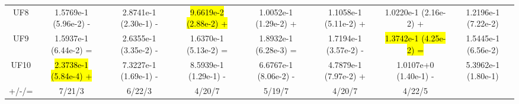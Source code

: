 \documentclass[journal]{IEEEtran}
\begin{document}
\begin{table}[tbp]
{\begin{tabular}{cccccccc}
      UF8     & 1.5769e-1 (5.96e-2) -      & 2.8741e-1 (2.30e-1) -      & \hl{9.6619e-2 (2.88e-2) +} & 1.0052e-1 (1.29e-2) +      & 1.1058e-1 (5.11e-2) +      & 1.0220e-1 (2.16e-2) +      & 1.2196e-1 (7.22e-2)      \\
      UF9     & 1.5937e-1 (6.44e-2) =      & 2.6355e-1 (3.35e-2) -      & 1.6370e-1 (5.13e-2) =      & 1.8932e-1 (6.28e-3) =      & 1.7194e-1 (3.57e-2) -      & \hl{1.3742e-1 (4.25e-2) =} & 1.5445e-1 (6.56e-2)      \\
      UF10    & \hl{2.3738e-1 (5.84e-4) +} & 7.3227e-1 (1.69e-1) -      & 8.5939e-1 (1.29e-1) -      & 6.6767e-1 (8.06e-2) -      & 4.7879e-1 (7.97e-2) +      & 1.0107e+0 (1.40e-1) -      & 5.3962e-1 (1.80e-1)      \\
      \hline
      +/-/=   & 7/21/3                     & 6/22/3                     & 4/20/7                     & 5/19/7                     & 4/20/7                     & 4/22/5                     &                          \\
      \bottomrule
    \end{tabular}
  }
  \label{tab:igd_all}
\end{table}
\end{document}
